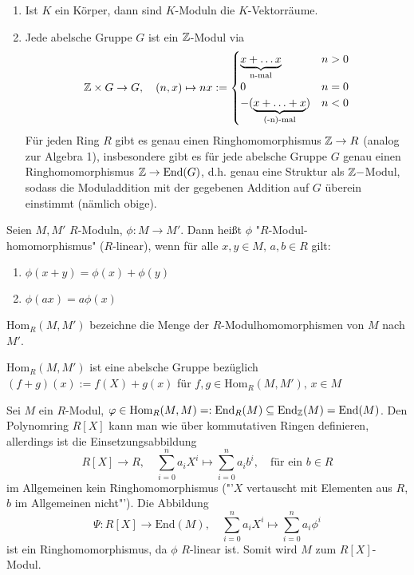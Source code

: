 \begin{bsp}
	\begin{enumerate}[label=\alph*)]
		\item Ist $K$ ein Körper, dann sind $K$-Moduln die $K$-Vektorräume.
		\item Jede abelsche Gruppe $G$ ist ein $\mathbb{Z}$-Modul via
		$$\mathbb{Z}\times G\to G, \quad (n,x) \mapsto nx:= \begin{cases} \underbrace{x+ \ldots x}_{\text{n-mal}}& n>0 \\
		0 & n=0\\
		-(\underbrace{x+ \ldots + x}_{\text{(-n)-mal}}) & n<0
		\end{cases}$$
		Für jeden Ring $R$ gibt es genau einen Ringhomomorphismus $\mathbb{Z}\to R$ (analog zur Algebra 1), insbesondere gibt es für jede abelsche Gruppe $G$ genau einen Ringhomomorphismus $\mathbb{Z}\to \text{End}(G)$, d.h. genau eine Struktur als $\mathbb{Z}-$Modul, sodass die Moduladdition mit der gegebenen Addition auf $G$ überein einstimmt (nämlich obige).
	\end{enumerate}
\end{bsp}
\begin{df}
	Seien $M,M'$ $R$-Moduln, $\phi:M \to M'$. Dann heißt $\phi$ "$R$-Modul-\\homomorphismus" ($R$-linear), wenn für alle $x,y\in M, \, a,b\in R$ gilt: 
	\begin{enumerate}[label=\alph*)]
		\item $\phi(x+y) = \phi(x) + \phi(y)$
		\item $\phi(ax) = a\phi(x)$
	\end{enumerate}
	$\text{Hom}_R(M, M')$ bezeichne die Menge der $R$-Modulhomomorphismen von $M$ nach $M'$.
\end{df}
\begin{anm}
	$\text{Hom}_R(M,M')$ ist eine abelsche Gruppe bezüglich $(f+g)(x) := f(X) + g(x)$ für $f,g\in \text{Hom}_R(M, M'), \, x\in M$
\end{anm}
\begin{bsp}
	Sei $M$ ein $R$-Modul, $\varphi\in \text{Hom}_R(M, M)=: \text{End}_R(M) \subseteq \text{End}_{\mathbb{Z}}(M) = \text{End}(M)$. Den Polynomring $R[X]$ kann man wie über kommutativen Ringen definieren, allerdings ist die Einsetzungsabbildung 
	$$R[X] \to R, \quad \sum_{i=0}^na_i X^i\mapsto \sum_{i=0}^na_ib^i, \quad \text{für ein } b\in R$$
	im Allgemeinen kein Ringhomomorphismus ("'$X$ vertauscht mit Elementen aus $R$, $b$ im Allgemeinen nicht"'). Die Abbildung 
	$$\Psi:R[X] \to \text{End}(M), \quad \sum_{i=0}^n a_i X^i \mapsto \sum_{i=0}^n a_i \phi^i$$
	ist ein Ringhomomorphismus, da $\phi$ $R$-linear ist. Somit wird $M$ zum $R[X]$-Modul.
\end{bsp}
